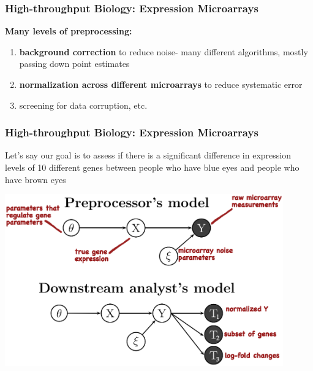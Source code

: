 \documentclass[10pt, compress]{beamer}
\begin{document}
\begin{frame}[fragile]
    \frametitle{High-throughput Biology: Expression Microarrays}
    
    \textbf{Many levels of preprocessing:} 

    \begin{enumerate}
    \item \textbf{background correction} to reduce noise- many different algorithms, mostly passing down point estimates
    \vspace*{5mm}
    \item \textbf{normalization across different microarrays} to reduce systematic error
    \vspace*{5mm}
    \item screening for data corruption, etc.
    \end{enumerate}
    
\end{frame}

\begin{frame}[fragile]
    \frametitle{High-throughput Biology: Expression Microarrays}
    Let's say our goal is to assess if there is a significant difference in expression levels of 10 different genes between people
    who have blue eyes and people who have brown eyes

    \centering
    \includegraphics[width=0.9\textwidth]{assets/dna_model.eps}


\end{frame}
\end{document}
